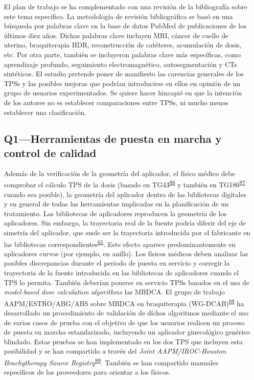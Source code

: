\documentclass[
  a4paper,
]{scrreprt}
\begin{document}
El plan de trabajo se ha complementado con una revisión de la
bibliografía sobre este tema específico. La metodología de revisión
bibliográfica se basó en una búsqueda por palabras clave en la base de
datos PubMed de publicaciones de los últimos diez años. Dichas palabras
clave incluyen MRI, cáncer de cuello de uterino, braquiterapia HDR,
reconstrucción de catéteres, acumulación de dosis, etc. Por otra parte,
también se incluyeron palabras clave más específicas, como aprendizaje
profundo, seguimiento electromagnético, autosegmentación y CTs
sintéticos. El estudio pretende poner de manifiesto las carencias
generales de los TPSs y las posibles mejoras que podrían introducirse en
ellos en opinión de un grupo de usuarios experimentados. Se quiere hacer
hincapié en que la intención de los autores no es establecer
comparaciones entre TPSs, ni mucho menos establecer una clasificación.

\hypertarget{sec-q1}{%
\subsection{Q1---Herramientas de puesta en marcha y control de
calidad}\label{sec-q1}}

Además de la verificación de la geometría del aplicador, el físico
médico debe comprobar el cálculo TPS de la dosis (basado en
TG43\textsuperscript{\protect\hyperlink{ref-rivard2004}{86}} y también
en TG186\textsuperscript{\protect\hyperlink{ref-beaulieu2012a}{87}}
cuando sea posible), la geometría del aplicador dentro de las
bibliotecas digitales y en general de todas las herramientas implicadas
en la planificación de un tratamiento. Las bibliotecas de aplicadores
reproducen la geometría de los aplicadores. Sin embargo, la trayectoria
real de la fuente podría diferir del eje de simetría del aplicador, que
suele ser la trayectoria introducida por el fabricante en las
bibliotecas
correspondientes\textsuperscript{\protect\hyperlink{ref-hellebust2010}{61}}.
Este efecto aparece predominantemente en aplicadores curvos (por
ejemplo, en anillo). Los físicos médicos deben analizar las posibles
discrepancias durante el periodo de puesta en servicio y corregir la
trayectoria de la fuente introducida en las bibliotecas de aplicadores
cuando el TPS lo permita. También deberían ponerse en servicio TPSs
basados en el uso de \emph{model-based dose calculation algorithms} las
MBDCA. El grupo de trabajo AAPM/ESTRO/ABG/ABS sobre MBDCA en
braquiterapia
(WG-DCAB)\textsuperscript{\protect\hyperlink{ref-beaulieu2023}{88}} ha
desarrollado un procedimiento de validación de dichos algoritmos
mediante el uso de varios casos de prueba con el objetivo de que los
usuarios realicen un proceso de puesta en marcha estandarizado,
incluyendo un aplicador ginecológico genérico blindado. Estas pruebas se
han implementado en los dos TPS que incluyen esta posibilidad y se han
compartido a través del \emph{Joint AAPM/IROC-Houston Brachytherapy
Source
Registry}\textsuperscript{\protect\hyperlink{ref-AAPMux2fIROC}{89}}.
También se han compartido manuales específicos de los proveedores para
orientar a los físicos.
\end{document}
